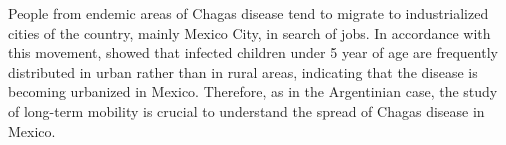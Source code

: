 People from endemic areas of Chagas disease tend to migrate to industrialized cities of the country, mainly Mexico City, in search of jobs.
In accordance with this movement, \cite{guzman2001epidemiology} showed
that infected children under 5 year of age are frequently distributed in urban
rather than in rural areas, indicating that the disease is becoming urbanized in
Mexico.
Therefore, as in the Argentinian case, the study of long-term mobility is crucial to understand the spread of Chagas disease in Mexico.






